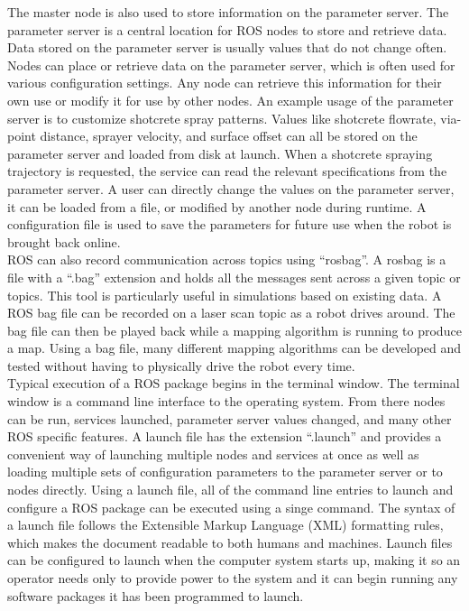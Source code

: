 The master node is also used to store information on the parameter server. The parameter server is a central location for ROS nodes to store and retrieve data. Data stored on the parameter server is usually values that do not change often. Nodes can place or retrieve data on the parameter server, which is often used for various configuration settings. Any node can retrieve this information for their own use or modify it for use by other nodes. An example usage of the parameter server is to customize shotcrete spray patterns. Values like shotcrete flowrate, via-point distance, sprayer velocity, and surface offset can all be stored on the parameter server and loaded from disk at launch. When a shotcrete spraying trajectory is requested, the service can read the relevant specifications from the parameter server. A user can directly change the values on the parameter server, it can be loaded from a file, or modified by another node during runtime. A configuration file is used to save the parameters for future use when the robot is brought back online.\\

ROS can also record communication across topics using ``rosbag''. A rosbag is a file with a ``.bag'' extension and holds all the messages sent across a given topic or topics. This tool is particularly useful in simulations based on existing data. A ROS bag file can be recorded on a laser scan topic as a robot drives around. The bag file can then be played back while a mapping algorithm is running to produce a map. Using a bag file, many different mapping algorithms can be developed and tested without having to physically drive the robot every time.\\

Typical execution of a ROS package begins in the terminal window. The terminal window is a command line interface to the operating system. From there nodes can be run, services launched, parameter server values changed, and many other ROS specific features. A launch file has the extension ``.launch'' and provides a convenient way of launching multiple nodes and services at once as well as loading multiple sets of configuration parameters to the parameter server or to nodes directly. Using a launch file, all of the command line entries to launch and configure a ROS package can be executed using a singe command. The syntax of a launch file follows the Extensible Markup Language (XML) formatting rules, which makes the document readable to both humans and machines. Launch files can be configured to launch when the computer system starts up, making it so an operator needs only to provide power to the system and it can begin running any software packages it has been programmed to launch.\\